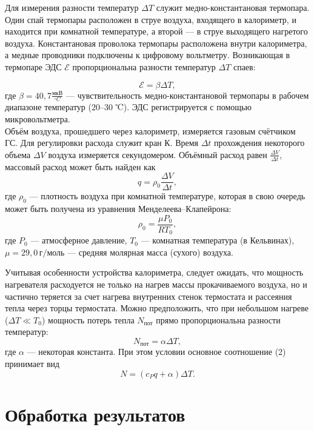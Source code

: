 \documentclass[a4paper,12pt]{article}
\begin{document}
        Для измерения разности температур \(\Delta T\) служит медно-константановая
        термопара. Один спай термопары расположен в струе воздуха, входящего в
        калориметр, и находится при комнатной температуре, а второй — в струе выходящего нагретого воздуха. Константановая проволока термопары расположена внутри калориметра, а медные проводники подключены к цифровому
        вольтметру. Возникающая в термопаре ЭДС \(\mathcal{E}\) пропорциональна разности
        температур \(\Delta T\) спаев:

        \[\mathcal{E} = \beta \Delta T,\]
        где $\beta = 40,7 \frac{\text{мкВ}}{^\circ C}$ --- чувствительность медно-константановой термопары в рабочем диапазоне температур (20–30 ℃). ЭДС регистрируется с помощью микровольтметра.\\

        
        Объём воздуха, прошедшего через калориметр, измеряется газовым счётчиком ГС. Для регулировки расхода служит кран К. Время \( \Delta t \) прохождения некоторого объема \( \Delta V \) воздуха измеряется секундомером. Объёмный расход равен \( \frac{\Delta V}{\Delta t} \), массовый расход может быть найден как
        \[
        q = \rho_0 \frac{\Delta V}{\Delta t},
        \]
        где \( \rho_0 \) — плотность воздуха при комнатной температуре, которая в свою очередь может быть получена из уравнения Менделеева–Клапейрона:
        \[
        \rho_0 = \frac{\mu P_0}{RT_0},
        \]
        где \( P_0 \) — атмосферное давление, \( T_0 \) — комнатная температура (в Кельвинах), \( \mu = 29,0 \, \text{г/моль} \) — средняя молярная масса (сухого) воздуха.
        
        Учитывая особенности устройства калориметра, следует ожидать, что мощность нагревателя расходуется не только на нагрев массы прокачиваемого воздуха, но и частично теряется за счет нагрева внутренних стенок термостата и рассеяния тепла через торцы термостата. Можно предположить, что при небольшом нагреве (\( \Delta T \ll T_0 \)) мощность потерь тепла \( N_{\text{пот}} \) прямо пропорциональна разности температур:
        \[
        N_{\text{пот}} = \alpha \Delta T,
        \]
        где \( \alpha \) — некоторая константа. При этом условии основное соотношение (2) принимает вид
        \[
        N = (c_P q + \alpha) \Delta T.
        \]
        \newpage

        \section{Обработка результатов}
\end{document}
